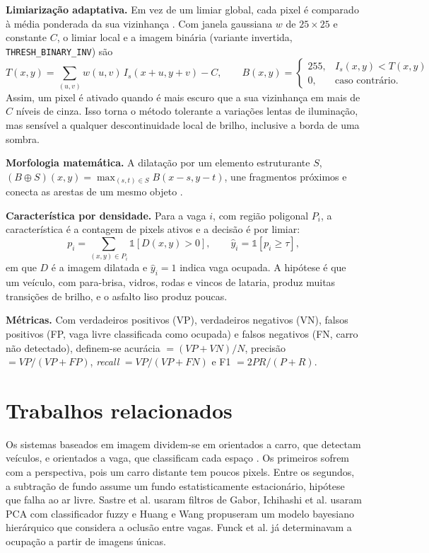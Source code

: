 \documentclass[
	article,			%
	11pt,				%
	oneside,			%
	a4paper,			%
	english,			%
	brazil,				%
	sumario=tradicional
	]{abntex2}
\begin{document}
\textbf{Limiarização adaptativa.} Em vez de um limiar global, cada pixel é comparado à média ponderada da sua vizinhança \cite{bradley2007adaptive}. Com janela gaussiana $w$ de $25\times25$ e constante $C$, o limiar local e a imagem binária (variante invertida, \texttt{THRESH\_BINARY\_INV}) são
\begin{equation}
T(x,y)=\sum_{(u,v)} w(u,v)\,I_s(x+u,y+v)-C,\qquad
B(x,y)=\begin{cases}255,& I_s(x,y)<T(x,y)\\ 0,&\text{caso contrário.}\end{cases}
\end{equation}
Assim, um pixel é ativado quando é mais escuro que a sua vizinhança em mais de $C$ níveis de cinza. Isso torna o método tolerante a variações lentas de iluminação, mas sensível a qualquer descontinuidade local de brilho, inclusive a borda de uma sombra.

\textbf{Morfologia matemática.} A dilatação por um elemento estruturante $S$, $(B\oplus S)(x,y)=\max_{(s,t)\in S}B(x-s,y-t)$, une fragmentos próximos e conecta as arestas de um mesmo objeto \cite{haralick1987morphology}.

\textbf{Característica por densidade.} Para a vaga $i$, com região poligonal $P_i$, a característica é a contagem de pixels ativos e a decisão é por limiar:
\begin{equation}
p_i=\sum_{(x,y)\in P_i}\mathbb{1}\!\left[D(x,y)>0\right],\qquad \hat{y}_i=\mathbb{1}\!\left[p_i\ge\tau\right],
\end{equation}
em que $D$ é a imagem dilatada e $\hat{y}_i=1$ indica vaga ocupada. A hipótese é que um veículo, com para-brisa, vidros, rodas e vincos de lataria, produz muitas transições de brilho, e o asfalto liso produz poucas.

\textbf{Métricas.} Com verdadeiros positivos (VP), verdadeiros negativos (VN), falsos positivos (FP, vaga livre classificada como ocupada) e falsos negativos (FN, carro não detectado), definem-se acurácia $=(VP+VN)/N$, precisão $=VP/(VP+FP)$, \textit{recall} $=VP/(VP+FN)$ e F1 $=2PR/(P+R)$.

\section{Trabalhos relacionados}

Os sistemas baseados em imagem dividem-se em orientados a carro, que detectam veículos, e orientados a vaga, que classificam cada espaço \cite{almeida2015pklot}. Os primeiros sofrem com a perspectiva, pois um carro distante tem poucos pixels. Entre os segundos, a subtração de fundo assume um fundo estatisticamente estacionário, hipótese que falha ao ar livre. Sastre et al. \cite{sastre2007gabor} usaram filtros de Gabor, Ichihashi et al. \cite{ichihashi2009fcm} usaram PCA com classificador fuzzy e Huang e Wang \cite{huang2010bayesian} propuseram um modelo bayesiano hierárquico que considera a oclusão entre vagas. Funck et al. \cite{funck2004carpark} já determinavam a ocupação a partir de imagens únicas.
\end{document}
